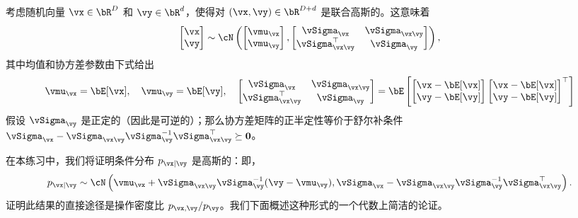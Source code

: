\documentclass[../../book-main.tex]{subfiles}
\begin{document}
\begin{exercise}\label{exercise:conditional_gaussian}
  考虑随机向量 $\vx \in \bR^D$ 和 $\vy \in \bR^d$，使得对 $(\vx, \vy) \in \bR^{D + d}$ 是联合高斯的。这意味着
  \begin{equation*}
    \begin{bmatrix}
      \vx \\
      \vy
    \end{bmatrix}
    \sim
    \cN \left(
      \begin{bmatrix}
        \vmu_{\vx} \\
        \vmu_{\vy}
      \end{bmatrix}
      ,
      \begin{bmatrix}
        \vSigma_{\vx} & \vSigma_{\vx\vy} \\
        \vSigma_{\vx\vy}^\top & \vSigma_{\vy}
      \end{bmatrix}
    \right),
  \end{equation*}
  其中均值和协方差参数由下式给出
  \begin{equation*}
    \vmu_{\vx} = \bE[\vx],\quad \vmu_{\vy} = \bE[\vy],\quad
    \begin{bmatrix}
      \vSigma_{\vx} & \vSigma_{\vx\vy} \\
      \vSigma_{\vx\vy}^\top & \vSigma_{\vy}
    \end{bmatrix}
    =
    \bE\left[
      \begin{bmatrix}
        \vx - \bE[\vx] \\
        \vy - \bE[\vy]
      \end{bmatrix}
      \begin{bmatrix}
        \vx - \bE[\vx] \\
        \vy - \bE[\vy]
      \end{bmatrix}^\top
      \right]
  \end{equation*}
  假设 $\vSigma_{\vy}$ 是正定的（因此是可逆的）；那么协方差矩阵的正半定性等价于舒尔补条件 $\vSigma_{\vx} - \vSigma_{\vx\vy} \vSigma_{\vy}^{-1}
  \vSigma_{\vx\vy}^\top \succeq \Zero$。

  在本练习中，我们将证明条件分布 $p_{\vx \mid
  \vy}$ 是高斯的：即，
  \begin{equation}\label{eq:gaussian-conditional-eqn}
    p_{\vx \mid \vy} \sim \cN\left(
      \vmu_{\vx} + \vSigma_{\vx\vy} \vSigma_{\vy}^{-1} (\vy - \vmu_{\vy}),
      \vSigma_{\vx} - \vSigma_{\vx\vy} \vSigma_{\vy}^{-1}
      \vSigma_{\vx\vy}^{\top}
    \right).
  \end{equation}
  证明此结果的直接途径是操作密度比 $p_{\vx, \vy} / p_{\vy}$。我们下面概述这种形式的一个代数上简洁的论证。


\end{exercise}
\end{document}
